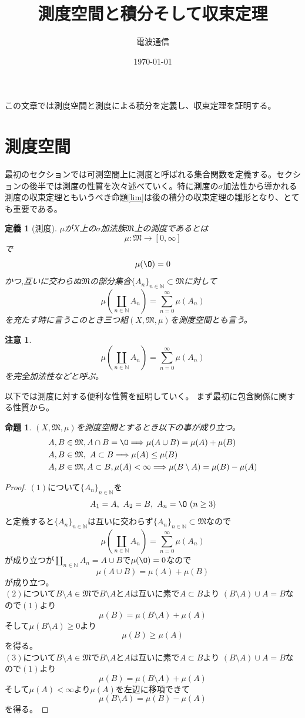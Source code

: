 \documentclass[leqno]{jsarticle}
\title{測度空間と積分そして収束定理}
\author{電波通信}
\date{\today}
\newtheorem{prop}[thm]{命題}
\newtheorem{df}[thm]{定義}
\newtheorem*{cau}{注意}
\newcommand{\To}{\Longrightarrow}
\newcommand{\nn}{\mathbb{N}}
\newcommand{\mgn}{\infty}
\newcommand{\mm}{\mathfrak{M}}
\newcommand{\s}{\sigma}
\begin{document}
			
\maketitle
この文章では測度空間と測度による積分を定義し、収束定理を証明する。
\section{測度空間}
最初のセクションでは可測空間上に測度と呼ばれる集合関数を定義する。セクションの後半では測度の性質を次々述べていく。特に測度の$\s$加法性から導かれる測度の収束定理ともいうべき命題\ref{lim}は後の積分の収束定理の雛形となり、とても重要である。

\begin{df}[測度]$\mu$が$X$上の$\sigma $加法族$\mm$上の測度であるとは
 \[
  \mu :\mm \rightarrow [0,\infty]
 \]
で
\[
\mu(\O)=0
\]
かつ,互いに交わらぬ$\mm$の部分集合$\{A_{n}\}_{n\in \nn}\subset \mm$に対して
 \[
  \mu \left(\coprod_{n\in \nn }{A_{n}}\right)=\sum_{n=0}^{\infty}\mu (A_{n})
 \]
を充たす時に言うこのとき三つ組$(X,\mm, \mu)$を測度空間とも言う。
\end{df}
\begin{cau}
\[
  \mu \left(\coprod_{n\in \nn }{A_{n}}\right)=\sum_{n=0}^{\infty}\mu (A_{n})
 \]
を完全加法性などと呼ぶ。
\end{cau}

以下では測度に対する便利な性質を証明していく。
まず最初に包含関係に関する性質から。
\setcounter{equation}{0}
\begin{prop}\label{a}
$(X,\mm,\mu)$を測度空間とするとき以下の事が成り立つ。
\begin{align}
&A,B\in \mm,A\cap B=\O\To\mu(A\cup B)=\mu(A)+\mu(B)\\ 
&A,B\in \mm,\ A\subset B\To\mu(A)\le \mu(B)\\ 
&A,B\in \mm,A\subset B,\mu(A)<\mgn \To \mu(B\setminus A)=\mu(B)-\mu(A)
\end{align}
\end{prop}
\begin{proof}
$(1)$について$\{A_n\}_{n\in\nn}$を
\[
A_1=A,\ A_2=B,\ A_n=\O\ (n\ge3)
\]
と定義すると$\{A_n\}_{n\in\nn}$は互いに交わらず$\{A_n\}_{n\in\nn}\subset\mm$なので
\[
\mu \left(\coprod_{n\in \nn }{A_{n}}\right)=\sum_{n=0}^{\infty}\mu (A_{n})
\]
が成り立つが$\coprod_{n\in \nn }{A_{n}}=A\cup B$で$\mu(\O)=0$なので
\[
\mu(A\cup B)=\mu(A)+\mu(B)
\]
が成り立つ。\\ 
$(2)$について$B\setminus A\in \mm$で$B\setminus A$と$A$は互いに素で$A\subset B$より
$(B\setminus A)\cup A=B$なので$(1)$より
\[
\mu(B)=\mu(B \setminus A)+\mu(A)
\]
そして$\mu(B \setminus A)\ge 0$より
\[
\mu(B)\ge\mu(A)
\]
を得る。\\ 
$(3)$について$B\setminus A\in \mm$で$B\setminus A$と$A$は互いに素で$A\subset B$より
$(B\setminus A)\cup A=B$なので$(1)$より
\[
\mu(B)=\mu(B \setminus A)+\mu(A)
\]
そして$\mu(A)<\mgn$より$\mu(A)$を左辺に移項できて
\[
\mu(B\setminus A)=\mu(B)-\mu(A)
\]
を得る。
\end{proof}
\end{document}

